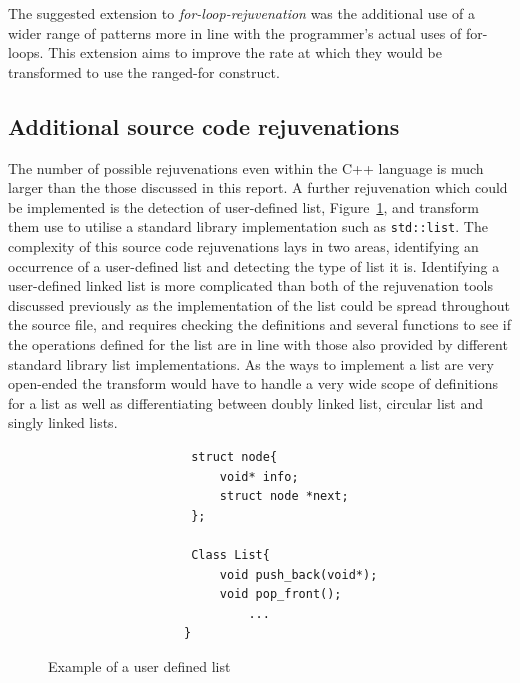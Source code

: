\documentclass[bsc,frontabs,singlespacing,twoside,parskip,deptreport]{infthesis}
\begin{document}
The suggested extension to \textit{for-loop-rejuvenation} was the additional use of a wider range of patterns more in line with the programmer's actual uses of for-loops. This extension aims to improve the rate at which they would be transformed to use the ranged-for construct.



\subsection{Additional source code rejuvenations}
The number of possible rejuvenations even within the C++ language is much larger than the those discussed in this report. A further rejuvenation which could be implemented is the detection of user-defined list, Figure~\ref{fig:user-def-list}, and transform them use to utilise a standard library implementation such as \texttt{std::list}. The complexity of this source code rejuvenations lays in two areas, identifying an occurrence of a user-defined list and detecting the type of list it is. Identifying a user-defined linked list is more complicated than both of the rejuvenation tools discussed previously as the implementation of the list could be spread throughout the source file, and requires checking the definitions and several functions to see if the operations defined for the list are in line with those also provided by different standard library list implementations. As the ways to implement a list are very open-ended the transform would have to handle a very wide scope of definitions for a list as well as differentiating between doubly linked list, circular list and singly linked lists.

\begin{figure}[htb]
    \centering
    \begin{verbatim}
                    struct node{
                        void* info;
                        struct node *next;
                    };
                    
                    Class List{
                        void push_back(void*);
                        void pop_front();
                            ...
                   }
    \end{verbatim}
    \caption{Example of a user defined list}
    \label{fig:user-def-list}
\end{figure}
\end{document}
